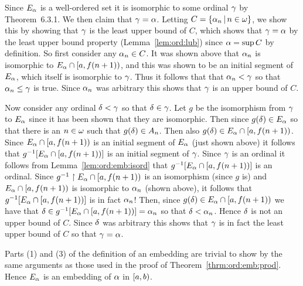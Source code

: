 {{    Since $E_\alpha$ is a well-ordered set it is isomorphic to some ordinal $\gamma$ by Theorem~6.3.1.
    We then claim that $\gamma = \alpha$.
    Letting $C = \left\{ \alpha_n \,|\, n \in \omega \right\}$, we show this by showing that $\gamma$ is the least upper bound of $C$, which shows that $\gamma = \alpha$ by the least upper bound property (Lemma~\ref{lem:ord:lub}) since $\alpha = \sup{C}$ by definition.
    So first consider any $\alpha_n \in C$.
    It was shown above that $\alpha_n$ is isomorphic to $E_\alpha \cap [a, f(n+1))$, and this was shown to be an initial segment of $E_\alpha$, which itself is isomorphic to $\gamma$.
    Thus it follows that that $\alpha_n < \gamma$ so that $\alpha_n \leq \gamma$ is true.
    Since $\alpha_n$ was arbitrary this shows that $\gamma$ is an upper bound of $C$.

    Now consider any ordinal $\delta < \gamma$ so that $\delta \in \gamma$.
    Let $g$ be the isomorphism from $\gamma$ to $E_\alpha$ since it has been shown that they are isomorphic.
    Then since $g(\delta) \in E_\alpha$ so that there is an $n \in \omega$ such that $g(\delta) \in A_n$.
    Then also $g(\delta) \in E_\alpha \cap [a, f(n+1))$.
    Since $E_\alpha \cap [a, f(n+1))$ is an initial segment of $E_\alpha$ (just shown above) it follows that $g^{-1}[E_\alpha \cap [a, f(n+1))]$ is an initial segment of $\gamma$.
    Since $\gamma$ is an ordinal it follows from Lemma~\ref{lem:ord:emb:isord} that $g^{-1}[E_\alpha \cap [a, f(n+1))]$ is an ordinal.
    Since $g^{-1} \restriction E_\alpha \cap [a, f(n+1))$ is an isomorphism (since $g$ is) and $E_\alpha \cap [a, f(n+1))$ is isomorphic to $\alpha_n$ (shown above), it follows that $g^{-1}[E_\alpha \cap [a, f(n+1))]$ is in fact $\alpha_n$!
    Then, since $g(\delta) \in E_\alpha \cap [a, f(n+1))$ we have that $\delta \in g^{-1}[E_\alpha \cap [a, f(n+1))] = \alpha_n$ so that $\delta < \alpha_n$.
    Hence $\delta$ is not an upper bound of $C$.
    Since $\delta$ was arbitrary this shows that $\gamma$ is in fact the least upper bound of $C$ so that $\gamma = \alpha$.
    
    Parts (1) and (3) of the definition of an embedding are trivial to show by the same arguments as those used in the proof of Theorem~\ref{thrm:ord:emb:prod}.
    Hence $E_\alpha$ is an embedding of $\alpha$ in $[a,b)$.
  }
  
  \mainprob

}
